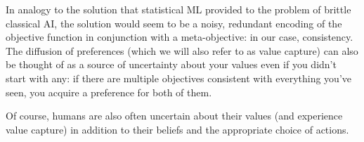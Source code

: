 \documentclass{article}
\begin{document}
	{\color{green!30!black}In analogy to the solution that statistical ML provided to the problem of brittle classical AI, the solution would seem to be a noisy, redundant encoding of the objective function in conjunction with a meta-objective: in our case, consistency. The diffusion of preferences (which we will also refer to as value capture) can also be thought of as a source of uncertainty about your values even if you didn't start with any: if there are multiple objectives consistent with everything you've seen, you acquire a preference for both of them.}

	Of course, humans are also often uncertain about their values (and experience value capture) in addition to their beliefs and the appropriate choice of actions.
	


	
\end{document}
